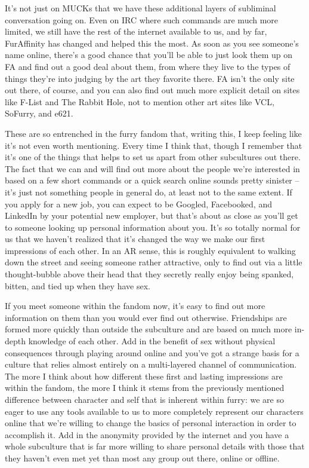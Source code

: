 It’s not just on MUCKs that we have these additional layers of subliminal conversation going on.  Even on IRC where such commands are much more limited, we still have the rest of the internet available to us, and by far, FurAffinity has changed and helped this the most.  As soon as you see someone’s name online, there’s a good chance that you’ll be able to just look them up on FA and find out a good deal about them, from where they live to the types of things they’re into judging by the art they favorite there.  FA isn’t the only site out there, of course, and you can also find out much more explicit detail on sites like F-List and The Rabbit Hole, not to mention other art sites like VCL, SoFurry, and e621.

These are so entrenched in the furry fandom that, writing this, I keep feeling like it’s not even worth mentioning.  Every time I think that, though I remember that it’s one of the things that helps to set us apart from other subcultures out there.  The fact that we can and will find out more about the people we’re interested in based on a few short commands or a quick search online sounds pretty sinister -- it’s just not something people in general do, at least not to the same extent.  If you apply for a new job, you can expect to be Googled, Facebooked, and LinkedIn by your potential new employer, but that’s about as close as you’ll get to someone looking up personal information about you.  It’s so totally normal for us that we haven’t realized that it’s changed the way we make our first impressions of each other.  In an AR sense, this is roughly equivalent to walking down the street and seeing someone rather attractive, only to find out via a little thought-bubble above their head that they secretly really enjoy being spanked, bitten, and tied up when they have sex.

If you meet someone within the fandom now, it’s easy to find out more information on them than you would ever find out otherwise.  Friendships are formed more quickly than outside the subculture and are based on much more in-depth knowledge of each other.  Add in the benefit of sex without physical consequences through playing around online and you’ve got a strange basis for a culture that relies almost entirely on a multi-layered channel of communication.  The more I think about how different these first and lasting impressions are within the fandom, the more I think it stems from the previously mentioned difference between character and self that is inherent within furry: we are so eager to use any tools available to us to more completely represent our characters online that we’re willing to change the basics of personal interaction in order to accomplish it.  Add in the anonymity provided by the internet and you have a whole subculture that is far more willing to share personal details with those that they haven’t even met yet than most any group out there, online or offline.

